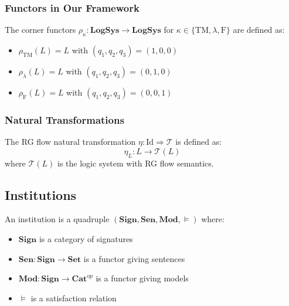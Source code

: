 \subsubsection{Functors in Our Framework}

\begin{definition}
The corner functors $\rho_\kappa: \mathbf{LogSys} \to \mathbf{LogSys}$ for $\kappa \in \{\mathrm{TM}, \lambda, \mathrm{F}\}$ are defined as:
\begin{itemize}
\item $\rho_{\mathrm{TM}}(L) = L$ with $(q_1,q_2,q_3) = (1,0,0)$
\item $\rho_{\lambda}(L) = L$ with $(q_1,q_2,q_3) = (0,1,0)$
\item $\rho_{\mathrm{F}}(L) = L$ with $(q_1,q_2,q_3) = (0,0,1)$
\end{itemize}
\end{definition}

\subsubsection{Natural Transformations}

\begin{definition}
The RG flow natural transformation $\eta: \text{Id} \Rightarrow \mathcal{T}$ is defined as:
$$\eta_L: L \to \mathcal{T}(L)$$
where $\mathcal{T}(L)$ is the logic system with RG flow semantics.
\end{definition}

\subsection{Institutions}

\begin{definition}[Institution]
An institution is a quadruple $(\mathbf{Sign}, \mathbf{Sen}, \mathbf{Mod}, \models)$ where:
\begin{itemize}
\item $\mathbf{Sign}$ is a category of signatures
\item $\mathbf{Sen}: \mathbf{Sign} \to \mathbf{Set}$ is a functor giving sentences
\item $\mathbf{Mod}: \mathbf{Sign} \to \mathbf{Cat}^{op}$ is a functor giving models
\item $\models$ is a satisfaction relation
\end{itemize}
\end{definition}

